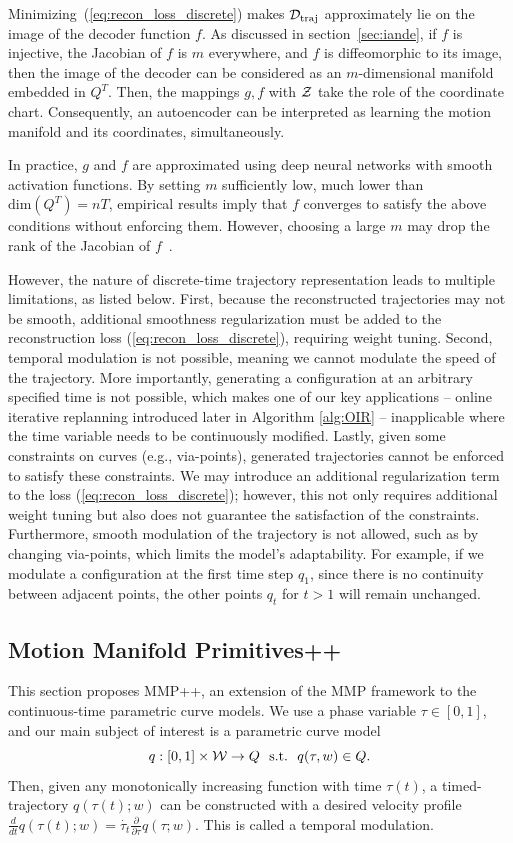 Minimizing~(\ref{eq:recon_loss_discrete}) makes ${\cal D}_{\rm traj}$ approximately lie on the image of the decoder function $f$. 
As discussed in section~\ref{sec:iande}, if $f$ is injective, the Jacobian of $f$ is $m$ everywhere, and $f$ is diffeomorphic to its image, then the image of the decoder can be considered as an $m$-dimensional manifold embedded in $Q^T$. 
Then, the mappings $g, f$ with ${\cal Z}$ take the role of the coordinate chart.
Consequently, an autoencoder can be interpreted as learning the motion manifold and its coordinates, simultaneously. 

In practice, $g$ and $f$ are approximated using deep neural networks with smooth activation functions. By setting $m$ sufficiently low, much lower than $\text{dim}(Q^T)=nT$, empirical results imply that $f$ converges to satisfy the above conditions without enforcing them. However, choosing a large $m$ may drop the rank of the Jacobian of $f$~\cite{lee2023geometric}.

However, the nature of discrete-time trajectory representation leads to multiple limitations, as listed below.
First, because the reconstructed trajectories may not be smooth, additional smoothness regularization must be added to the reconstruction loss (\ref{eq:recon_loss_discrete}), requiring weight tuning. 
Second, temporal modulation is not possible, meaning we cannot modulate the speed of the trajectory. More importantly, generating a configuration at an arbitrary specified time is not possible, which makes one of our key applications -- online iterative replanning introduced later in Algorithm \ref{alg:OIR} -- inapplicable where the time variable needs to be continuously modified. 
Lastly, given some constraints on curves (e.g., via-points), generated trajectories cannot be enforced to satisfy these constraints. We may introduce an additional regularization term to the loss (\ref{eq:recon_loss_discrete}); however, this not only requires additional weight tuning but also does not guarantee the satisfaction of the constraints. Furthermore, smooth modulation of the trajectory is not allowed, such as by changing via-points, which limits the model's adaptability. For example, if we modulate a configuration at the first time step \(q_1\), since there is no continuity between adjacent points, the other points \(q_t\) for \(t > 1\) will remain unchanged.


\subsection{Motion Manifold Primitives++}
This section proposes MMP++, an extension of the MMP framework to the continuous-time parametric curve models.
We use a phase variable $\tau \in [0,1]$, and our main subject of interest is a parametric curve model
\begin{equation}
    q: [0,1] \times {\cal W} \to Q \:\:\: \text{s.t.} \:\:\: q(\tau, w) \in Q.
\end{equation}
Then, given any monotonically increasing function with time $\tau(t)$, a timed-trajectory $q(\tau(t);w)$ can be constructed with a desired velocity profile $\frac{d}{dt}q(\tau(t); w) = \dot{\tau_t}\frac{\partial}{\partial\tau}q(\tau;w)$. This is called a temporal modulation.

